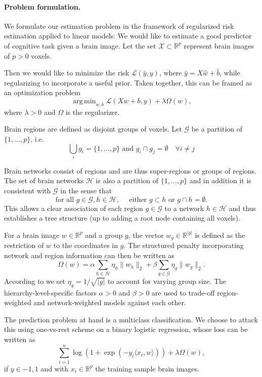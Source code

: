 \documentclass{article} %
\DeclareMathOperator*{\argmin}{arg\,min}
\newcommand{\R}{\mathbb{R}}
\begin{document}
\paragraph{Problem formulation.}
We formulate our estimation problem in the framework of regularized risk
estimation applied to linear models: 
We would like to estimate a good predictor of cognitive task
given a brain image. Let the set \(\mathcal X\subset\R^p\) represent brain
images of \(p > 0\) voxels.

Then we would like to minimize the risk \(\mathcal L(\hat y, y)\), where
\(\hat y = X\hat w + \hat b\), while regularizing to incorporate a useful
prior. Taken together, this can be framed as an optimization problem
\[\argmin_{w, b} \mathcal L(Xw + b, y) + \lambda\Omega(w),\]
where \(\lambda > 0\) and \(\Omega\) is the regularizer.

Brain regions are defined as disjoint groups of voxels. Let \(\mathcal G\)
be a partition of \(\{1, \dots, p\}\), i.e.
\[  \bigcup_{i} g_i = \{1, \dots, p\} \textrm{ and } g_i\cap g_j=\emptyset
\quad\forall i\not=j\]

Brain networks consist of regions and are thus super-regions or groups of 
regions. The set of brain networks \(\mathcal{H}\) is also a partition of 
\(\{1, \dots, p\}\) and in addition it is consistent with \(\mathcal G\) in
the sense that
\[\textrm{for all }g\in\mathcal G, h\in\mathcal H,\quad
\textrm{ either } g\subset h\textrm{ or }g\cap h = \emptyset.\]
This allows a clear association of each region \(g\in\mathcal G\) to a 
network \(h\in\mathcal H\) and thus establishes a tree structure (up to 
adding a root node containing all voxels).

For a brain image \(w\in\R^p\) and a group \(g\), the vector 
\(w_g\in\R^{|g|}\) is defined as the restriction of \(w\) to the coordinates
 in \(g\). The structured penalty incorporating network
and region information can then be written as
\[\Omega(w) = \alpha\sum_{h\in\mathcal H}\eta_h\|w_h\|_2 + \beta\sum_{g\in\mathcal G}\eta_g\|w_g\|_2.\]
According to \cite{Zhou_or_who_was_that} we set \(\eta_g = 1/\sqrt{|g|}\) to
account for varying group size. The hierarchy-level-specific factors 
\(\alpha > 0\) and \(\beta > 0\) are used to trade-off region-weighted and
network-weighted models against each other.

The prediction problem at hand is a multiclass classification. We choose to
attack this using one-vs-rest scheme on a binary logistic regression, whose
loss can be written as
\[\sum_{i=1}^n\log(1 + \exp(-y_i\langle x_i, w\rangle)) + \lambda\Omega(w),\]
if \(y\in{-1, 1}\) and with \(x_i\in\R^p\) the training sample brain images.
\end{document}
